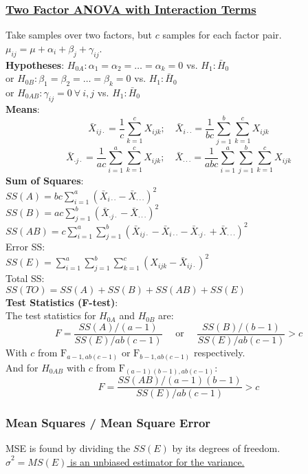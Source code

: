 \documentclass{article}
\begin{document}
\begin{multicols*}{2}
\subsubsection*{\underline{Two Factor ANOVA with Interaction Terms}}
Take samples over two factors, but $c$ samples for each factor pair. $\mu_{ij} = \mu + \alpha_{i} + \beta_{j} + \gamma_{ij}$.\\
\textbf{Hypotheses}: $H_{0A}: \alpha_{1} = \alpha_{2} = \dots = \alpha_{k} = 0$ vs. $H_{1}: \bar{H}_{0}$\\
or $H_{0B}: \beta_{1} = \beta_{2} = \dots = \beta_{k} = 0$ vs. $H_{1}: \bar{H}_{0}$\\
or $H_{0AB}: \gamma_{ij} = 0\ \forall\ i, j$ vs. $H_{1}: \bar{H}_{0}$\\
\textbf{Means}:
$$\bar{X}_{i j \cdot} = \frac{1}{c} \sum_{k=1}^{c} X_{ijk}; \quad \bar{X}_{i \cdot \cdot} = \frac{1}{bc} \sum_{j=1}^{b} \sum_{k=1}^{c} X_{ijk}$$
$$ \bar{X}_{\cdot j \cdot} = \frac{1}{ac} \sum_{i=1}^{a} \sum_{k=1}^{c} X_{ijk}; \quad \bar{X}_{\cdot \cdot \cdot} = \frac{1}{abc} \sum_{i=1}^{a} \sum_{j=1}^{b} \sum_{k=1}^{c} X_{ijk}$$
\textbf{Sum of Squares}:\\
$SS(A) = bc \sum_{i=1}^{a} (\bar{X}_{i \cdot \cdot} - \bar{X}_{\cdot \cdot \cdot})^{2}$\\
$SS(B) = ac \sum_{j=1}^{b} (\bar{X}_{\cdot j \cdot} - \bar{X}_{\cdot \cdot \cdot})^{2}$\\
$SS(AB) = c \sum_{i=1}^{a} \sum_{j=1}^{b} (\bar{X}_{i j \cdot} - \bar{X}_{i \cdot \cdot} - \bar{X}_{\cdot j \cdot} + \bar{X}_{\cdot \cdot \cdot})^{2}$\\
Error SS:\\
$SS(E) = \sum_{i=1}^{a} \sum_{j=1}^{b} \sum_{k=1}^{c} (X_{ijk} - \bar{X}_{i j \cdot})^{2}$\\
Total SS:\\
$SS(TO) = SS(A) + SS(B) + SS(AB) + SS(E)$\\
\textbf{Test Statistics (F-test)}:\\
The test statistics for $H_{0A}$ and $H_{0B}$ are:
$$F = \frac{SS(A) / (a-1)}{SS(E) / ab(c-1)} \quad \mbox{ or } \quad \frac{SS(B) / (b-1)}{SS(E) / ab(c-1)} > c$$
With $c$ from $\mbox{F}_{a-1, ab(c-1)}$ or $\mbox{F}_{b-1, ab(c-1)}$ respectively.\\
And for $H_{0AB}$ with $c$ from $\mbox{F}_{(a-1)(b-1), ab(c-1)}$:
$$F = \frac{SS(AB) / (a-1)(b-1)}{SS(E) / ab(c-1)} > c$$

\subsubsection*{Mean Squares / Mean Square Error}
MSE is found by dividing the $SS(E)$ by its degrees of freedom.\\
\underline{$\hat{\sigma}^{2} = MS(E)$ is an unbiased estimator for the variance.}


\end{multicols*}
\end{document}
